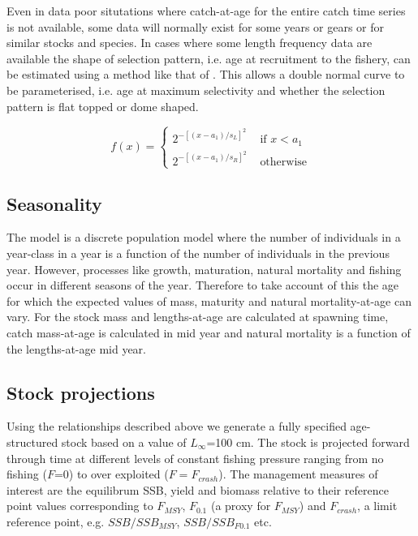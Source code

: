 \documentclass[10pt]{article}
\begin{document}
\begin{description}
Even in data poor situtations where catch-at-age for the entire catch time series is not available, some data will normally exist for 
some years or gears or for similar stocks and species. In cases where some length frequency data are available the shape of selection pattern, i.e.
age at recruitment to the fishery, can be estimated using a method like that of \cite{wetherall1987estimating}. This allows
a double normal curve to be parameterised, i.e. age at maximum selectivity and whether the selection pattern is flat topped or dome shaped.

\begin{equation}
f(x) = \left\{ \begin{array}{rl}
 2^{-[(x-a_1)/s_L]^2} &\mbox{ if $x<a_1$} \\
 2^{-[(x-a_1)/s_R]^2} &\mbox{ otherwise}
       \end{array} \right.
\end{equation}
 
\end{description}

\subsection{Seasonality}

The model is a discrete population model where the number of individuals in a year-class in a year is a function of the number of individuals in the previous year.
However, processes like growth, maturation, natural mortality and fishing occur in different seasons of the year. Therefore to take account of this the age for which
the expected values of mass, maturity and natural mortality-at-age can vary.
For the stock mass and lengths-at-age are calculated at spawning time, catch mass-at-age is calculated in mid year and natural mortality is a function of the lengths-at-age 
mid year.  

\subsection{Stock projections}
Using the relationships described above we generate a fully specified age-structured stock based on a value of $L_{\infty}$=100 cm. The stock is projected
forward through time at different levels of constant fishing pressure ranging from no fishing ($F$=0) to over exploited ($F=F_{crash}$).
The management measures of interest are the equilibrum SSB, yield and biomass relative to their reference point values corresponding to
$F_{MSY}$, $F_{0.1}$ (a proxy for $F_{MSY}$) and $F_{crash}$, a limit reference point, e.g. $SSB / SSB_{MSY}$, $SSB / SSB_{F0.1}$ etc.
\end{document}

